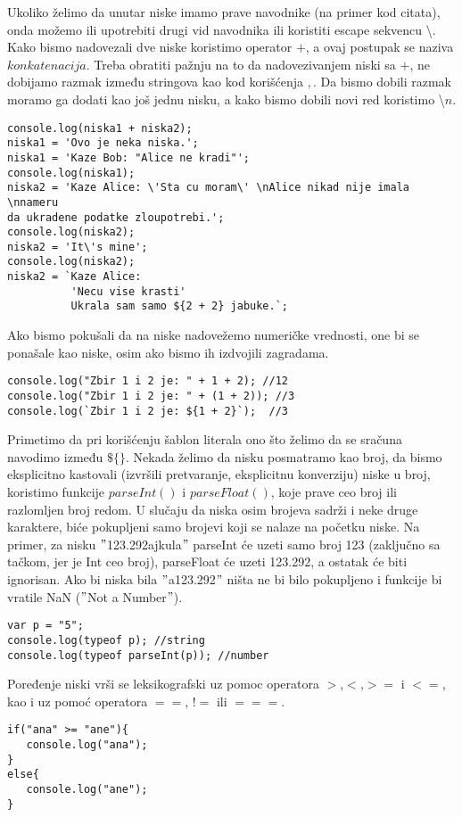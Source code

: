 Ukoliko želimo da unutar niske imamo prave navodnike (na primer kod citata), onda možemo ili upotrebiti drugi vid navodnika ili koristiti escape sekvencu \textbackslash. Kako bismo nadovezali dve niske koristimo operator $+$, a ovaj postupak se naziva $konkatenacija$. Treba obratiti pažnju na to da nadovezivanjem niski sa $+$, ne dobijamo razmak između stringova kao kod korišćenja $,$. Da bismo dobili razmak moramo ga dodati kao još jednu nisku, a kako bismo dobili novi red koristimo \textbackslash$n$. 
\begin{lstlisting}[backgroundcolor = \color{lightgray}, breaklines=true]
console.log(niska1 + niska2); 
niska1 = 'Ovo je neka niska.';
niska1 = 'Kaze Bob: "Alice ne kradi"';
console.log(niska1);
niska2 = 'Kaze Alice: \'Sta cu moram\' \nAlice nikad nije imala \nnameru
da ukradene podatke zloupotrebi.';
console.log(niska2); 
niska2 = 'It\'s mine';
console.log(niska2);
niska2 = `Kaze Alice:
          'Necu vise krasti'
          Ukrala sam samo ${2 + 2} jabuke.`;
\end{lstlisting}
Ako bismo pokušali da na niske nadovežemo numeričke vrednosti, one bi se ponašale kao niske, osim ako bismo ih izdvojili zagradama.
\begin{lstlisting}[backgroundcolor = \color{lightgray}, breaklines=true]
console.log("Zbir 1 i 2 je: " + 1 + 2); //12
console.log("Zbir 1 i 2 je: " + (1 + 2)); //3
console.log(`Zbir 1 i 2 je: ${1 + 2}`);  //3
\end{lstlisting}
Primetimo da pri korišćenju šablon literala ono što želimo da se sračuna navodimo između $\$\{\}$.
Nekada želimo da nisku posmatramo kao broj, da bismo eksplicitno kastovali (izvršili pretvaranje, eksplicitnu konverziju) niske u broj, koristimo funkcije $parseInt()$ i $parseFloat()$, koje prave ceo broj ili razlomljen broj redom. U slučaju da niska osim brojeva sadrži i neke druge karaktere, biće pokupljeni samo brojevi koji se nalaze na početku niske. Na primer, za nisku $"$123.292ajkula$"$ parseInt će uzeti samo broj 123 (zaključno sa tačkom, jer je Int ceo broj), parseFloat će uzeti 123.292, a ostatak će biti ignorisan. Ako bi niska bila $"$a123.292$"$ ništa ne bi bilo pokupljeno i funkcije bi vratile NaN ($"$Not a Number$"$). 
\begin{lstlisting}[backgroundcolor = \color{lightgray}, breaklines=true]
var p = "5";
console.log(typeof p); //string
console.log(typeof parseInt(p)); //number
\end{lstlisting}
Poređenje niski vrši se leksikografski uz pomoc operatora $>$,$<$,$>=$ i $<=$, kao i uz pomoć operatora $==$, $!=$ ili $===$.
\begin{lstlisting}[backgroundcolor = \color{lightgray}, breaklines=true]
if("ana" >= "ane"){
   console.log("ana");
}
else{
   console.log("ane");
}
\end{lstlisting}


